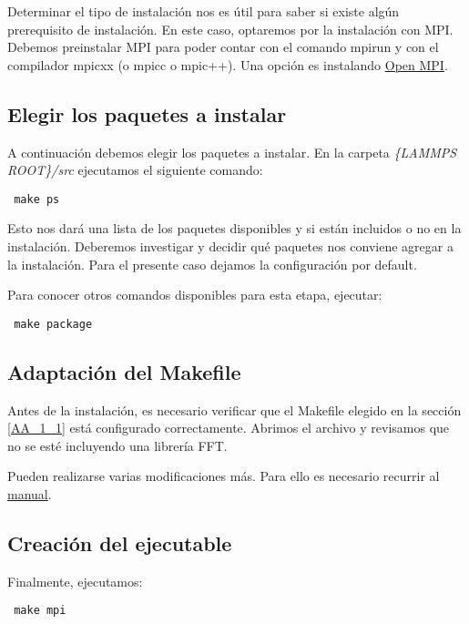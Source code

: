 Determinar el tipo de instalación nos es útil para saber si existe algún prerequisito de instalación. En este caso, optaremos por la instalación con MPI. Debemos preinstalar MPI para poder contar con el comando mpirun y con el compilador mpicxx (o mpicc o mpic++). Una opción es instalando \href{https://www.open-mpi.org/}{Open MPI}.

\subsection{Elegir los paquetes a instalar}
\label{AA_1_2}

A continuación debemos elegir los paquetes a instalar. En la carpeta \textit{\{LAMMPS ROOT\}/src} ejecutamos el siguiente comando:

\begin{lstlisting}
 make ps
\end{lstlisting}

Esto nos dará una lista de los paquetes disponibles y si están incluidos o no en la instalación. Deberemos investigar y decidir qué paquetes nos conviene agregar a la instalación. Para el presente caso dejamos la configuración por default.

Para conocer otros comandos disponibles para esta etapa, ejecutar:

\begin{lstlisting}
 make package
\end{lstlisting}

\subsection{Adaptación del Makefile}
\label{AA_1_3}

Antes de la instalación, es necesario verificar que el Makefile elegido en la sección \ref{AA_1_1} está configurado correctamente. Abrimos el archivo y revisamos que no se esté incluyendo una librería FFT.

Pueden realizarse varias modificaciones más. Para ello es necesario recurrir al \href{http://lammps.sandia.gov/doc/}{manual}.

\subsection{Creación del ejecutable}
\label{AA_1_4}

Finalmente, ejecutamos:

\begin{lstlisting}
 make mpi
\end{lstlisting}

